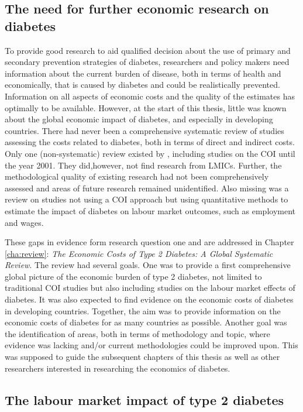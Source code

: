 \subsection{The need for further economic research on diabetes}

To provide good research to aid qualified decision about the use of primary and secondary prevention strategies of diabetes, researchers and policy makers need information about the current burden of disease, both in terms of health and economically, that is caused by diabetes and could be realistically prevented. Information on all aspects of economic costs and the quality of the estimates has optimally to be available. However, at the start of this thesis, little was known about the global economic impact of diabetes, and especially in developing countries. There had never been a comprehensive systematic review of studies assessing the costs related to diabetes, both in terms of direct and indirect costs. Only one (non-systematic) review existed by \textcite{Ettaro2004}, including studies on the \ac{COI} until the year 2001. They did,however, not find research from \acp{LMIC}. Further, the methodological quality of existing research had not been comprehensively assessed and areas of future research remained unidentified. Also missing was a review on studies not using a \ac{COI} approach but using quantitative methods to estimate the impact of diabetes on labour market outcomes, such as employment and wages.

These gaps in evidence form research question one and are addressed in Chapter \ref{cha:review}: \textit{The Economic Costs of Type 2 Diabetes: A Global Systematic Review}. The review had several goals. One was to provide a first comprehensive global picture of the economic burden of type 2 diabetes, not limited to traditional \ac{COI} studies but also including studies on the labour market effects of diabetes. It was also expected to find evidence on the economic costs of diabetes in developing countries. Together, the aim was to provide information on the economic costs of diabetes for as many countries as possible. Another goal was the identification of areas, both in terms of methodology and topic, where evidence was lacking and/or current methodologies could be improved upon. This was supposed to guide the subsequent chapters of this thesis as well as other researchers interested in researching the economics of diabetes.

\subsection{The labour market impact of type 2 diabetes}


